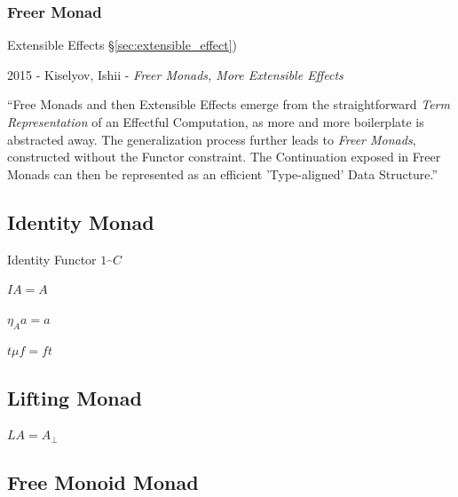 \subsubsection{Freer Monad}\label{sec:freer_monad}

Extensible Effects \S\ref{sec:extensible_effect})

2015 - Kiselyov, Ishii - \emph{Freer Monads, More Extensible Effects}

``Free Monads and then Extensible Effects emerge from the straightforward
\emph{Term Representation} of an Effectful Computation, as more and more
boilerplate is abstracted away. The generalization process further leads to
\emph{Freer Monads}, constructed without the Functor constraint. The
Continuation exposed in Freer Monads can then be represented as an efficient
'Type-aligned' Data Structure.''



\subsection{Identity Monad}\label{sec:identity_monad}

Identity Functor $1_\cat{C}$

$I A = A$

$\eta_A a = a$

$t \mu f = f t$



\subsection{Lifting Monad}\label{sec:lifting_monad}

$L A = A_\bot$




\subsection{Free Monoid Monad}\label{sec:free_monoid_monad}

